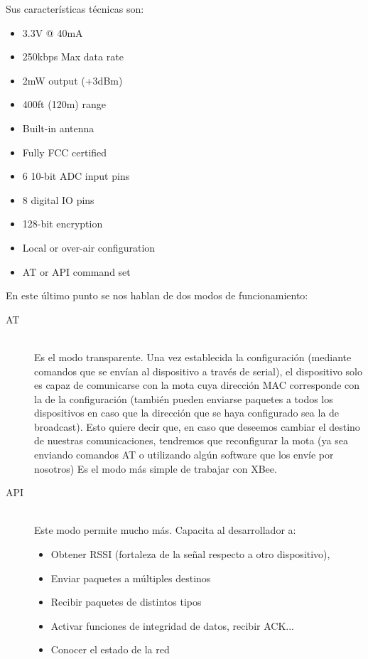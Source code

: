 Sus características técnicas son:
\begin{itemize}
  \item 3.3V @ 40mA
  \item 250kbps Max data rate
  \item 2mW output (+3dBm)
  \item 400ft (120m) range
  \item Built-in antenna
  \item Fully FCC certified
  \item 6 10-bit ADC input pins
  \item 8 digital IO pins
  \item 128-bit encryption
  \item Local or over-air configuration
  \item AT or API command set
\end{itemize}

En este último punto se nos hablan de dos modos de funcionamiento:

\begin{description}
  \item[AT] \hfill \\
    Es el modo transparente. Una vez establecida la configuración (mediante comandos
    que se envían al dispositivo a través de serial), el dispositivo solo es capaz de
    comunicarse con la mota cuya dirección MAC corresponde con la de la configuración
    (también pueden enviarse paquetes a todos los dispositivos en caso que la dirección
    que se haya configurado sea la de broadcast). Esto quiere decir que, en caso que
    deseemos cambiar el destino de nuestras comunicaciones, tendremos que reconfigurar
    la mota (ya sea enviando comandos AT o utilizando algún software que los envíe
    por nosotros) Es el modo más simple de trabajar con XBee.
 \item[API] \hfill \\
    Este modo permite mucho más. Capacita al desarrollador a:
      \begin{itemize}
        \item Obtener RSSI (fortaleza de la señal respecto a otro dispositivo),
        \item Enviar paquetes a múltiples destinos
        \item Recibir paquetes de distintos tipos
        \item Activar funciones de integridad de datos, recibir ACK...
        \item Conocer el estado de la red
      \end{itemize}
\end{description}



